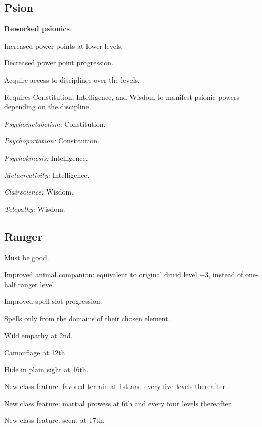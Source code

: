 \subsection{Psion}
\begin{itemize*}
\item \textbf{Reworked psionics}.
\item Increased power points at lower levels.
\item Decreased power point progression.
\item Acquire access to disciplines over the levels.
\item Requires Constitution, Intelligence, and Wisdom to manifest psionic powers depending on the discipline.
	\begin{itemize*}
	\item \textit{Psychometabolism:} Constitution.
	\item \textit{Psychoportation:} Constitution.
	\item \textit{Psychokinesis:} Intelligence.
	\item \textit{Metacreativity:} Intelligence.
	\item \textit{Clairscience:} Wisdom.
	\item \textit{Telepathy:} Wisdom.
	\end{itemize*}
\end{itemize*}


\subsection{Ranger}
\begin{itemize*}
\item Must be good.
\item Improved animal companion: equivalent to original druid level $-3$, instead of one-half ranger level.
\item Improved spell slot progression.
\item Spells only from the domains of their chosen element.
\item Wild empathy at 2nd.
\item Camouflage at 12th.
\item Hide in plain sight at 16th.
\item New class feature: favored terrain at 1st and every five levels thereafter.
\item New class feature: martial prowess at 6th and every four levels thereafter.
\item New class feature: scent at 17th.
\end{itemize*}

